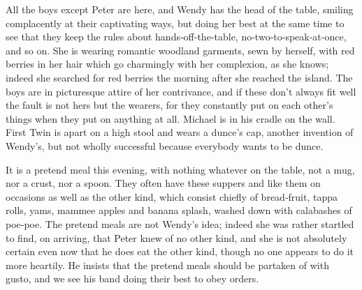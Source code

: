 \begin{Settings}
All the boys except Peter are here, and Wendy has the head of the table,
smiling complacently at their captivating ways,
but doing her best at the same time to see that they keep the rules
about hands‐off‐the‐table, no‐two‐to‐speak‐at‐once, and so on.
She is wearing romantic woodland garments, sewn by herself, with red berries in her hair
which go charmingly with her complexion, as she knows;
indeed she searched for red berries the morning after she reached the island.
The boys are in picturesque attire of her contrivance,
and if these don’t always fit well the fault is not hers but the wearers,
for they constantly put on each other’s things when they put on anything at all.
Michael is in his cradle on the wall.
First Twin is apart on a high stool and wears a dunce’s cap, another invention of Wendy’s,
but not wholly successful because everybody wants to be dunce.

It is a pretend meal this evening, with nothing whatever on the table, not a mug, nor a crust, nor a spoon.
They often have these suppers and like them on occasions
as well as the other kind, which consist chiefly of bread‐fruit, tappa rolls, yams, mammee apples and banana splash,
washed down with calabashes of poe‐poe.
The pretend meals are not Wendy’s idea;
indeed she was rather startled to find, on arriving, that Peter knew of no other kind,
and she is not absolutely certain even now that he does eat the other kind,
though no one appears to do it more heartily.
He insists that the pretend meals should be partaken of with gusto,
and we see his band doing their best to obey orders.
\end{Settings}

